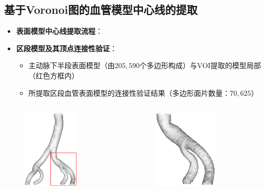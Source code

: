 \subsection[中心线提取]{基于Voronoi图的血管模型中心线的提取}

\begin{frame}
\begin{itemize}
  \item \textbf{表面模型中心线提取流程}：
\end{itemize}
\begin{figure}[t]
\centering

\end{figure}
\end{frame}

\begin{frame}
\begin{itemize}
  \item \textbf{区段模型及其顶点连接性验证}：
  \begin{itemize}
    \item 主动脉下半段表面模型（由$205,590$个多边形构成）与VOI提取的模型局部（红色方框内）
    \item 所提取区段血管表面模型的连接性验证结果（多边形面片数量：$70,625$）
  \end{itemize}
\end{itemize}
\begin{columns}[b,onlytextwidth]
\begin{column}{.5\textwidth}
\begin{figure}[t]
\centering
\includegraphics[height=1.5in]{../../Figures/postprocessing/centerlines/VOI.eps}
\end{figure}
\end{column}
\begin{column}{.5\textwidth}
\begin{figure}[t]
\centering
\includegraphics[height=1.5in]{../../Figures/postprocessing/centerlines/connectivity_local.eps}
\end{figure}
\end{column}
\end{columns}
\end{frame}

